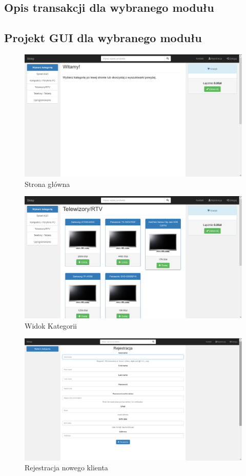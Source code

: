 \documentclass[10pt,a4paper]{article}
\begin{document}
   \subsection{Opis transakcji dla wybranego modułu}
   \begin{landscape}
   \pagestyle{empty}
   \subsection{Projekt GUI dla wybranego modułu}
   \begin{figure}[H]
   \caption{Strona główna}
   \centering
   \includegraphics[scale=0.6]{mainpage}
   \end{figure}
   \newpage
   \begin{figure}[H]
   \caption{Widok Kategorii}
   \centering
   \includegraphics[scale=0.6]{categories}
   \end{figure}
   \newpage
   \begin{figure}[H]
   \caption{Rejestracja nowego klienta}
   \centering
   \includegraphics[scale=0.6]{register}

\end{figure}
\end{landscape}
\end{document}
